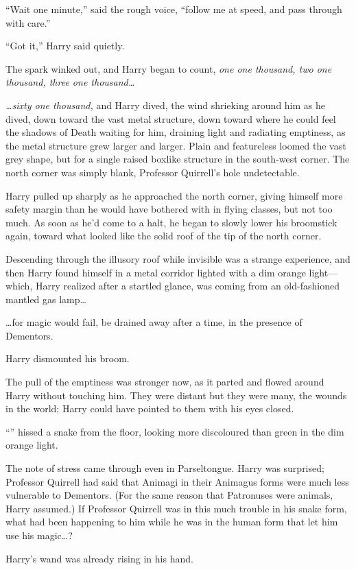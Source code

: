 “Wait one minute,” said the rough voice, “follow me at speed, and pass through with care.”

“Got it,” Harry said quietly.

The spark winked out, and Harry began to count, \emph{one one thousand, two one thousand, three one thousand…}

\emph{…sixty one thousand,} and Harry dived, the wind shrieking around him as he dived, down toward the vast metal structure, down toward where he could feel the shadows of Death waiting for him, draining light and radiating emptiness, as the metal structure grew larger and larger. Plain and featureless loomed the vast grey shape, but for a single raised boxlike structure in the south-west corner. The north corner was simply blank, Professor Quirrell’s hole undetectable.

Harry pulled up sharply as he approached the north corner, giving himself more safety margin than he would have bothered with in flying classes, but not too much. As soon as he’d come to a halt, he began to slowly lower his broomstick again, toward what looked like the solid roof of the tip of the north corner.

Descending through the illusory roof while invisible was a strange experience, and then Harry found himself in a metal corridor lighted with a dim orange light—which, Harry realized after a startled glance, was coming from an old-fashioned mantled gas lamp…

…for magic would fail, be drained away after a time, in the presence of Dementors.

Harry dismounted his broom.

The pull of the emptiness was stronger now, as it parted and flowed around Harry without touching him. They were distant but they were many, the wounds in the world; Harry could have pointed to them with his eyes closed.

“” hissed a snake from the floor, looking more discoloured than green in the dim orange light.

The note of stress came through even in Parseltongue. Harry was surprised; Professor Quirrell had said that Animagi in their Animagus forms were much less vulnerable to Dementors. (For the same reason that Patronuses were animals, Harry assumed.) If Professor Quirrell was in this much trouble in his snake form, what had been happening to him while he was in the human form that let him use his magic…?

Harry’s wand was already rising in his hand.

